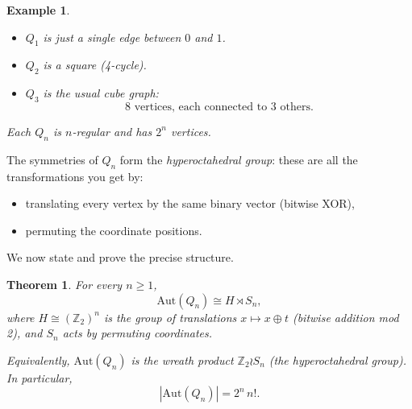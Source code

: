 \documentclass[12pt,a4paper,openany]{book}
\newtheorem{theorem}{Theorem}[section]
\newtheorem{example}{Example}[section]
\begin{document}
\begin{example}
\begin{itemize}
\item \(Q_1\) is just a single edge between \(0\) and \(1\).
\item \(Q_2\) is a square (4-cycle).
\item \(Q_3\) is the usual cube graph:
\[
\text{\(8\) vertices, each connected to \(3\) others.}
\]
\end{itemize}
Each \(Q_n\) is \(n\)-regular and has \(2^n\) vertices.

\begin{center}
\end{center}
\end{example}

\bigskip

The symmetries of \(Q_n\) form the \emph{hyperoctahedral group}: these are all the transformations you get by:
\begin{itemize}
\item translating every vertex by the same binary vector (bitwise XOR),
\item permuting the coordinate positions.
\end{itemize}

We now state and prove the precise structure.

\begin{theorem}
For every \(n \ge 1\),
\[
\mathrm{Aut}(Q_n) \cong H \rtimes S_n,
\]
where \(H \cong (\mathbb{Z}_2)^n\) is the group of translations \(x \mapsto x \oplus t\) (bitwise addition mod 2), and \(S_n\) acts by permuting coordinates.  

Equivalently, \(\mathrm{Aut}(Q_n)\) is the wreath product \(\mathbb{Z}_2 \wr S_n\) (the hyperoctahedral group). In particular,
\[
|\mathrm{Aut}(Q_n)| = 2^n \, n!.
\]
\end{theorem}
\end{document}
